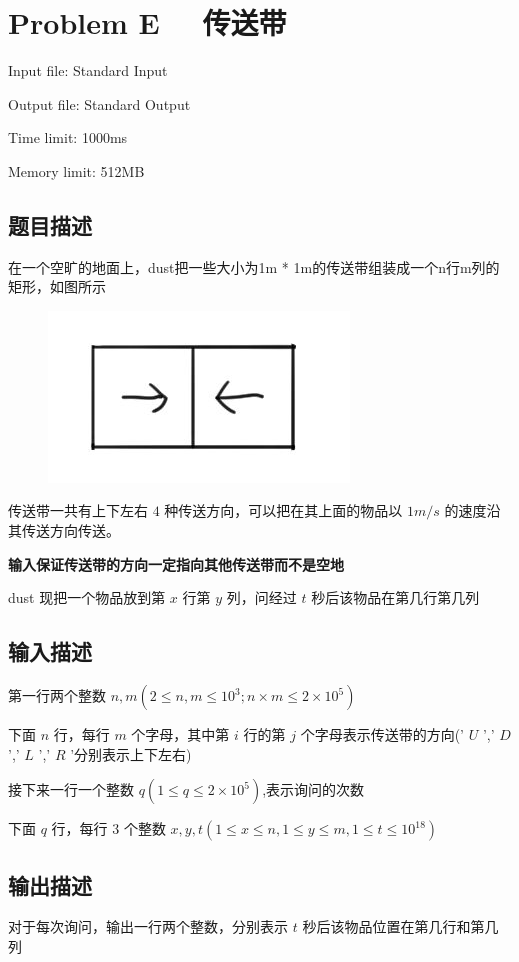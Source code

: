 \newpage
\section{Problem E \ \ 传送带}
{ \limitfont{}
Input file: Standard Input \par
Output file: Standard Output \par
Time limit: 1000ms \par
Memory limit: 512MB \par
}
\subsection*{题目描述}
在一个空旷的地面上，dust把一些大小为1m * 1m的传送带组装成一个n行m列的矩形，如图所示
\begin{figure}[H]
    \centering
    \includegraphics[scale=0.4]{./src/h.png}
\end{figure}
传送带一共有上下左右 $4$ 种传送方向，可以把在其上面的物品以 $1m/s$ 的速度沿其传送方向传送。

\textbf{输入保证传送带的方向一定指向其他传送带而不是空地}

dust 现把一个物品放到第 $x$ 行第 $y$ 列，问经过 $t$ 秒后该物品在第几行第几列
\subsection*{输入描述}
第一行两个整数 $n,m(2 \le n,m \le 10^3; n \times m \le 2 \times 10^5)$

下面 $n$ 行，每行 $m$ 个字母，其中第 $i$ 行的第 $j$ 个字母表示传送带的方向(' $U$ ',' $D$ ',' $L$ ',' $R$ '分别表示上下左右)

接下来一行一个整数 $q(1 \le q \le 2 \times 10^5)$,表示询问的次数

下面 $q$ 行，每行 $3$ 个整数 $x,y,t(1 \le x \le n,1 \le y \le m,1 \le t \le 10^{18})$
\subsection*{输出描述}

对于每次询问，输出一行两个整数，分别表示 $t$ 秒后该物品位置在第几行和第几列

